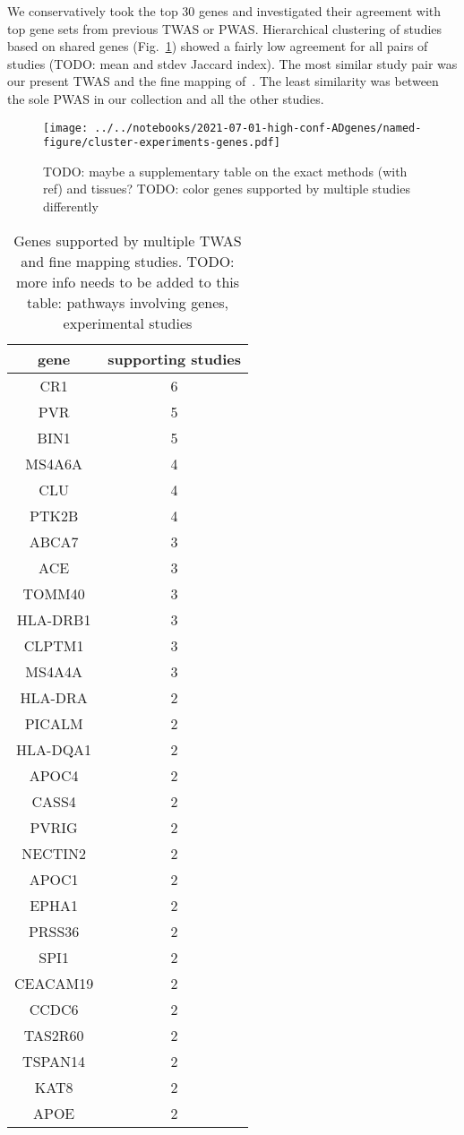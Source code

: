 \documentclass[letterpaper]{article}
\begin{document}
We conservatively took the top 30 genes and investigated their agreement with top gene
sets from previous TWAS or PWAS.  Hierarchical clustering of studies based on
shared genes (Fig.~\ref{fig:twas-clustermap}) showed a fairly low agreement for all
pairs of studies (TODO: mean and stdev Jaccard index).  The most
similar study pair was our present TWAS and the fine mapping of~\cite{Jansen2019}.  The least
similarity was between the sole PWAS in our collection and all the other
studies.

\begin{figure}
\texttt{[image: ../../notebooks/2021-07-01-high-conf-ADgenes/named-figure/cluster-experiments-genes.pdf]}
\caption{
  TODO: maybe a supplementary table on the exact methods (with ref) and
  tissues?  TODO: color genes supported by multiple studies differently
}
\label{fig:twas-clustermap}
\end{figure}

\begin{table}
  \footnotesize
\begin{tabular}{cc}
  gene       & supporting studies \\
  \hline
  CR1        & 6\\
  PVR        & 5\\
  BIN1       & 5\\
  MS4A6A     & 4\\
  CLU        & 4\\
  PTK2B      & 4\\
  ABCA7      & 3\\
  ACE        & 3\\
  TOMM40     & 3\\
  HLA-DRB1   & 3\\
  CLPTM1     & 3\\
  MS4A4A     & 3\\
  HLA-DRA    & 2\\
  PICALM     & 2\\
  HLA-DQA1   & 2\\
  APOC4      & 2\\
  CASS4      & 2\\
  PVRIG      & 2\\
  NECTIN2    & 2\\
  APOC1      & 2\\
  EPHA1      & 2\\
  PRSS36     & 2\\
  SPI1       & 2\\
  CEACAM19   & 2\\
  CCDC6      & 2\\
  TAS2R60    & 2\\
  TSPAN14    & 2\\
  KAT8       & 2\\
  APOE       & 2\\
\end{tabular}
\caption{
Genes supported by multiple TWAS and fine mapping studies.  TODO: more info
needs to be added to this table: pathways involving genes, experimental
studies
}
\label{tab:twas-genes}
\end{table}
\end{document}
